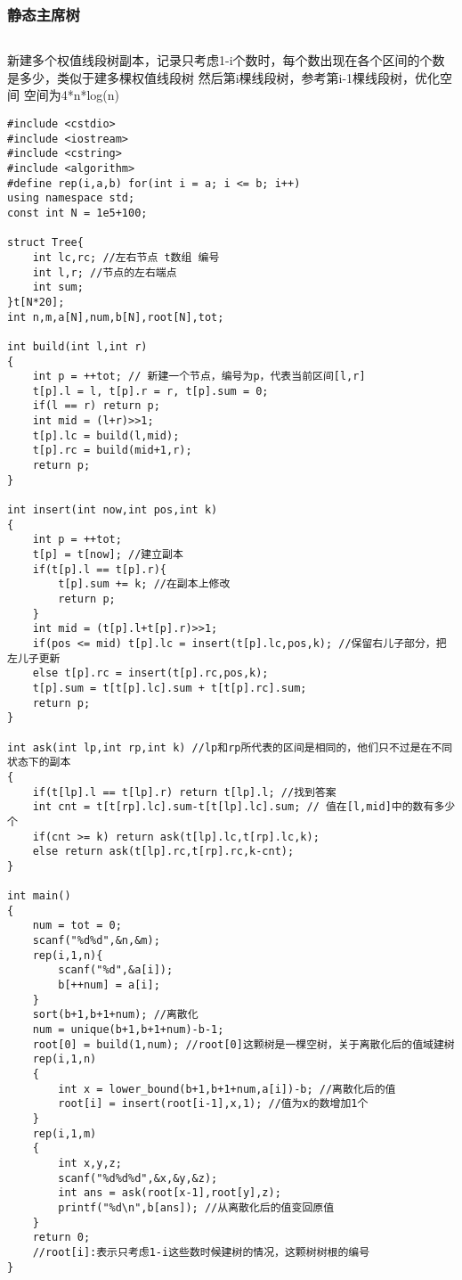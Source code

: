 \documentclass[twoside]{article}
\begin{document}
\subsubsection{静态主席树}
\begin{lstlisting}
\end{lstlisting}
新建多个权值线段树副本，记录只考虑1-i个数时，每个数出现在各个区间的个数是多少，类似于建多棵权值线段树
然后第i棵线段树，参考第i-1棵线段树，优化空间
空间为4*n*log(n)
\begin{lstlisting}
#include <cstdio>
#include <iostream>
#include <cstring>
#include <algorithm>
#define rep(i,a,b) for(int i = a; i <= b; i++)
using namespace std;
const int N = 1e5+100;

struct Tree{
	int lc,rc; //左右节点 t数组 编号
	int l,r; //节点的左右端点
	int sum; 
}t[N*20];
int n,m,a[N],num,b[N],root[N],tot;

int build(int l,int r)
{
	int p = ++tot; // 新建一个节点，编号为p，代表当前区间[l,r]
	t[p].l = l, t[p].r = r, t[p].sum = 0;
	if(l == r) return p;
	int mid = (l+r)>>1;
	t[p].lc = build(l,mid);
	t[p].rc = build(mid+1,r);
	return p;
}

int insert(int now,int pos,int k)
{
	int p = ++tot;
	t[p] = t[now]; //建立副本
	if(t[p].l == t[p].r){
		t[p].sum += k; //在副本上修改
		return p;
	}
	int mid = (t[p].l+t[p].r)>>1;
	if(pos <= mid) t[p].lc = insert(t[p].lc,pos,k); //保留右儿子部分，把左儿子更新
	else t[p].rc = insert(t[p].rc,pos,k);
	t[p].sum = t[t[p].lc].sum + t[t[p].rc].sum;
	return p;
}

int ask(int lp,int rp,int k) //lp和rp所代表的区间是相同的，他们只不过是在不同状态下的副本
{
	if(t[lp].l == t[lp].r) return t[lp].l; //找到答案
	int cnt = t[t[rp].lc].sum-t[t[lp].lc].sum; // 值在[l,mid]中的数有多少个
	if(cnt >= k) return ask(t[lp].lc,t[rp].lc,k);
	else return ask(t[lp].rc,t[rp].rc,k-cnt);
}

int main()
{
	num = tot = 0;
	scanf("%d%d",&n,&m);
	rep(i,1,n){
		scanf("%d",&a[i]);
		b[++num] = a[i];
	}
	sort(b+1,b+1+num); //离散化
	num = unique(b+1,b+1+num)-b-1;
	root[0] = build(1,num); //root[0]这颗树是一棵空树，关于离散化后的值域建树
	rep(i,1,n)
	{
		int x = lower_bound(b+1,b+1+num,a[i])-b; //离散化后的值
		root[i] = insert(root[i-1],x,1); //值为x的数增加1个
	}
	rep(i,1,m)
	{
		int x,y,z;
		scanf("%d%d%d",&x,&y,&z);
		int ans = ask(root[x-1],root[y],z);
		printf("%d\n",b[ans]); //从离散化后的值变回原值
	}
	return 0;
	//root[i]:表示只考虑1-i这些数时候建树的情况，这颗树树根的编号
}\end{lstlisting}
\end{document}
